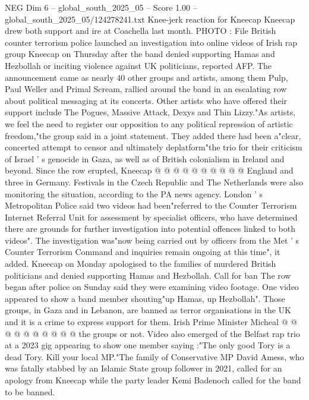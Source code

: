 \begin{textsample}{NEG Dim 6 – global\_south\_2025\_05 – Score 1.00 – global\_south\_2025\_05/124278241.txt}  \label{ex:f6_neg_394}
Knee-jerk reaction for Kneecap Kneecap drew both support and ire at Coachella last month.
PHOTO : File British counter terrorism police launched an investigation into online videos of Irish rap group Kneecap on Thursday after the band denied supporting Hamas and Hezbollah or inciting violence against UK politicians, reported AFP.
The announcement came as nearly 40 other groups and artists, among them Pulp, Paul Weller and Primal Scream, rallied around the band in an escalating row about political messaging at its concerts.
Other artists who have offered their support include The Pogues, Massive Attack, Dexys and Thin Lizzy."As artists, we feel the need to register our opposition to any political repression of artistic freedom,"the group said in a joint statement.
They added there had been a"clear, concerted attempt to censor and ultimately deplatform"the trio for their criticism of Israel ' s genocide in Gaza, as well as of British colonialism in Ireland and beyond.
Since the row erupted, Kneecap @ @ @ @ @ @ @ @ @ @ England and three in Germany.
Festivals in the Czech Republic and The Netherlands were also monitoring the situation, according to the PA news agency.
London ' s Metropolitan Police said two videos had been"referred to the Counter Terrorism Internet Referral Unit for assessment by specialist officers, who have determined there are grounds for further investigation into potential offences linked to both videos".
The investigation was"now being carried out by officers from the Met ' s Counter Terrorism Command and inquiries remain ongoing at this time", it added.
Kneecap on Monday apologised to the families of murdered British politicians and denied supporting Hamas and Hezbollah.
Call for ban The row began after police on Sunday said they were examining video footage.
One video appeared to show a band member shouting"up Hamas, up Hezbollah".
Those groups, in Gaza and in Lebanon, are banned as terror organisations in the UK and it is a crime to express support for them.
Irish Prime Minister Micheal @ @ @ @ @ @ @ @ @ @ the groups or not.
Video also emerged of the Belfast rap trio at a 2023 gig appearing to show one member saying :"The only good Tory is a dead Tory.
Kill your local MP."The family of Conservative MP David Amess, who was fatally stabbed by an Islamic State group follower in 2021, called for an apology from Kneecap while the party leader Kemi Badenoch called for the band to be banned.

\end{textsample}
